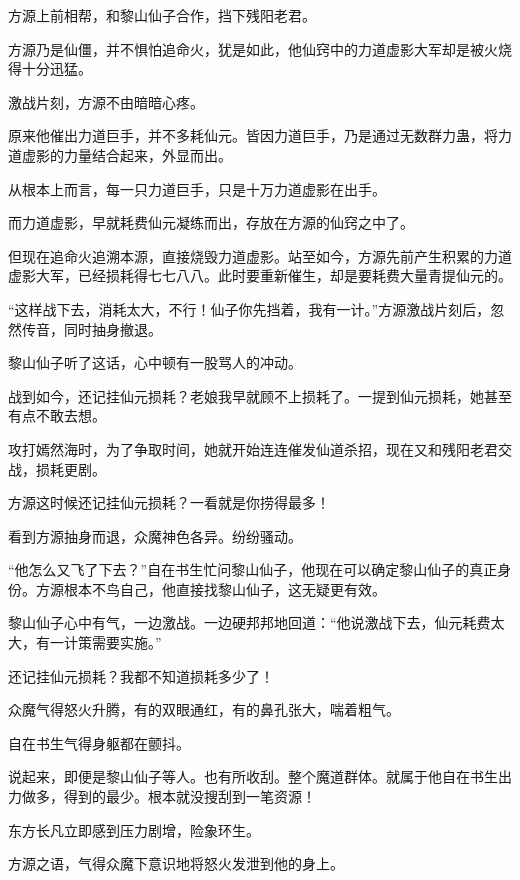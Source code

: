 
\begin{this_body}

方源上前相帮，和黎山仙子合作，挡下残阳老君。

方源乃是仙僵，并不惧怕追命火，犹是如此，他仙窍中的力道虚影大军却是被火烧得十分迅猛。

激战片刻，方源不由暗暗心疼。

原来他催出力道巨手，并不多耗仙元。皆因力道巨手，乃是通过无数群力蛊，将力道虚影的力量结合起来，外显而出。

从根本上而言，每一只力道巨手，只是十万力道虚影在出手。

而力道虚影，早就耗费仙元凝练而出，存放在方源的仙窍之中了。

但现在追命火追溯本源，直接烧毁力道虚影。站至如今，方源先前产生积累的力道虚影大军，已经损耗得七七八八。此时要重新催生，却是要耗费大量青提仙元的。

“这样战下去，消耗太大，不行！仙子你先挡着，我有一计。”方源激战片刻后，忽然传音，同时抽身撤退。

黎山仙子听了这话，心中顿有一股骂人的冲动。

战到如今，还记挂仙元损耗？老娘我早就顾不上损耗了。一提到仙元损耗，她甚至有点不敢去想。

攻打嫣然海时，为了争取时间，她就开始连连催发仙道杀招，现在又和残阳老君交战，损耗更剧。

方源这时候还记挂仙元损耗？一看就是你捞得最多！

看到方源抽身而退，众魔神色各异。纷纷骚动。

“他怎么又飞了下去？”自在书生忙问黎山仙子，他现在可以确定黎山仙子的真正身份。方源根本不鸟自己，他直接找黎山仙子，这无疑更有效。

黎山仙子心中有气，一边激战。一边硬邦邦地回道：“他说激战下去，仙元耗费太大，有一计策需要实施。”

还记挂仙元损耗？我都不知道损耗多少了！

众魔气得怒火升腾，有的双眼通红，有的鼻孔张大，喘着粗气。

自在书生气得身躯都在颤抖。

说起来，即便是黎山仙子等人。也有所收刮。整个魔道群体。就属于他自在书生出力做多，得到的最少。根本就没搜刮到一笔资源！

东方长凡立即感到压力剧增，险象环生。

方源之语，气得众魔下意识地将怒火发泄到他的身上。


\end{this_body}
